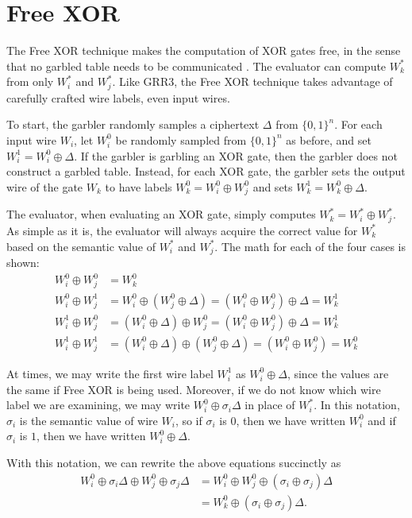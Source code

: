 \section{Free XOR}
The Free XOR technique makes the computation of XOR gates free, in the sense that no garbled table needs to be communicated \cite{freexor}.
The evaluator can compute $W_k^*$ from only $W_i^*$ and $W_j^*$.
Like GRR3, the Free XOR technique takes advantage of carefully crafted wire labels, even input wires.

To start, the garbler randomly samples a ciphertext $\Delta$ from $\{0,1\}^n$.
For each input wire $W_i$, let $W_i^0$ be randomly sampled from $\{0,1\}^n$ as before, and set $W_i^1 = W_i^0 \oplus \Delta$.
If the garbler is garbling an XOR gate, then the garbler does not construct a garbled table.
Instead, for each XOR gate, the garbler sets the output wire of the gate $W_k$ to have labels $W_k^0 = W_i^0 \oplus W_j^0$ and sets $W_k^1 = W_k^0 \oplus \Delta$.

The evaluator, when evaluating an XOR gate, simply computes $W_k^* = W_i^* \oplus W_j^*$.
As simple as it is, the evaluator will always acquire the correct value for $W_k^*$ based on the semantic value of $W_i^*$ and $W_j^*$.
The math for each of the four cases is shown:
\begin{align*}
    W_i^0 \oplus W_j^0 & = W_k^0 \\
    W_i^0 \oplus W_j^1 & = W_i^0 \oplus (W_j^0 \oplus \Delta) = (W_i^0 \oplus W_j^0) \oplus \Delta = W_k^1 \\
    W_i^1 \oplus W_j^0 & = (W_i^0 \oplus \Delta) \oplus W_j^0 = (W_i^0 \oplus W_j^0) \oplus \Delta = W_k^1 \\
    W_i^1 \oplus W_j^1 & = (W_i^0 \oplus \Delta) \oplus (W_j^0 \oplus \Delta) = (W_i^0 \oplus W_j^0) = W_k^0
\end{align*}

At times, we may write the first wire label $W_i^1$ as $W_i^0 \oplus \Delta$, since the values are the same if Free XOR is being used. 
Moreover, if we do not know which wire label we are examining, we may write $W_i^0 \oplus \sigma_i \Delta$ in place of $W_i^*$. 
In this notation, $\sigma_i$ is the semantic value of wire $W_i$, so if $\sigma_i$ is $0$, then we have written $W_i^0$ and if $\sigma_i$ is $1$, then we have written $W_i^0 \oplus \Delta$.

With this notation, we can rewrite the above equations succinctly as
\begin{align*}
	W_i^0 \oplus \sigma_i \Delta \oplus W_j^0 \oplus \sigma_j \Delta & = W_i^0 \oplus W_j^0 \oplus (\sigma_i \oplus \sigma_j) \Delta \\
	& = W_k^0 \oplus (\sigma_i \oplus \sigma_j) \Delta.
\end{align*}

